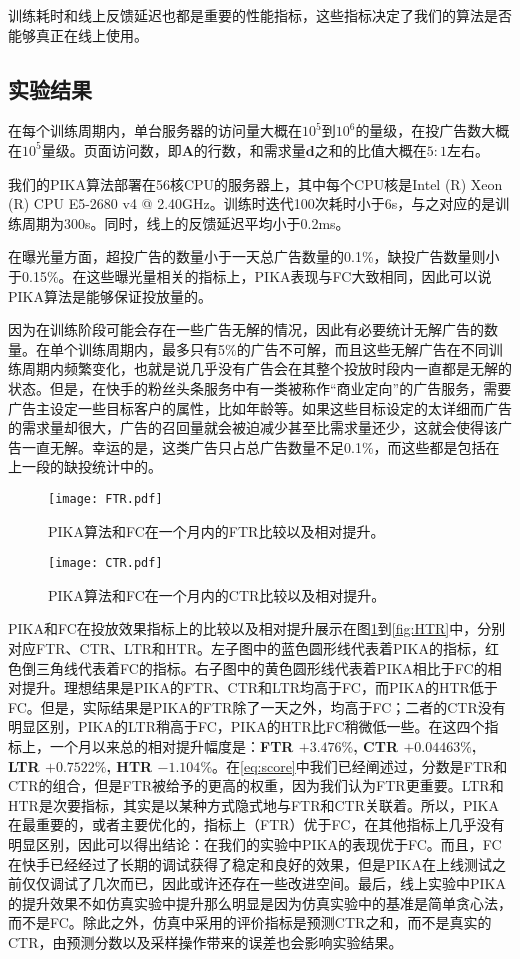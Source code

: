 训练耗时和线上反馈延迟也都是重要的性能指标，这些指标决定了我们的算法是否能够真正在线上使用。

\subsection{实验结果}

在每个训练周期内，单台服务器的访问量大概在$10^5$到$10^6$的量级，在投广告数大概在$10^5$量级。页面访问数，即$\bm{A}$的行数，和需求量$\bm{d}$之和的比值大概在$5:1$左右。

我们的PIKA算法部署在56核CPU的服务器上，其中每个CPU核是Intel (R) Xeon (R) CPU E5-2680 v4 @ 2.40GHz。训练时迭代100次耗时小于6s，与之对应的是训练周期为300s。同时，线上的反馈延迟平均小于0.2ms。

在曝光量方面，超投广告的数量小于一天总广告数量的0.1\%，缺投广告数量则小于0.15\%。在这些曝光量相关的指标上，PIKA表现与FC大致相同，因此可以说PIKA算法是能够保证投放量的。

因为在训练阶段可能会存在一些广告无解的情况，因此有必要统计无解广告的数量。在单个训练周期内，最多只有5\%的广告不可解，而且这些无解广告在不同训练周期内频繁变化，也就是说几乎没有广告会在其整个投放时段内一直都是无解的状态。但是，在快手的粉丝头条服务中有一类被称作“商业定向”的广告服务，需要广告主设定一些目标客户的属性，比如年龄等。如果这些目标设定的太详细而广告的需求量却很大，广告的召回量就会被迫减少甚至比需求量还少，这就会使得该广告一直无解。幸运的是，这类广告只占总广告数量不足0.1\%，而这些都是包括在上一段的缺投统计中的。

\begin{figure}[tb]
	\centering
	\texttt{[image: FTR.pdf]}
	\caption{PIKA算法和FC在一个月内的FTR比较以及相对提升。}
	\label{fig:FTR}
\end{figure}

\begin{figure}[tb]
	\centering
	\texttt{[image: CTR.pdf]}
	\caption{PIKA算法和FC在一个月内的CTR比较以及相对提升。}
	\label{fig:CTR}
\end{figure}

PIKA和FC在投放效果指标上的比较以及相对提升展示在图\ref{fig:FTR}到\ref{fig:HTR}中，分别对应FTR、CTR、LTR和HTR。左子图中的蓝色圆形线代表着PIKA的指标，红色倒三角线代表着FC的指标。右子图中的黄色圆形线代表着PIKA相比于FC的相对提升。理想结果是PIKA的FTR、CTR和LTR均高于FC，而PIKA的HTR低于FC。但是，实际结果是PIKA的FTR除了一天之外，均高于FC；二者的CTR没有明显区别，PIKA的LTR稍高于FC，PIKA的HTR比FC稍微低一些。在这四个指标上，一个月以来总的相对提升幅度是：\textbf{FTR $+3.476\%$, CTR $+0.04463\%$, LTR $+0.7522\%$, HTR $-1.104\%$}。在\eqref{eq:score}中我们已经阐述过，分数是FTR和CTR的组合，但是FTR被给予的更高的权重，因为我们认为FTR更重要。LTR和HTR是次要指标，其实是以某种方式隐式地与FTR和CTR关联着。所以，PIKA在最重要的，或者主要优化的，指标上（FTR）优于FC，在其他指标上几乎没有明显区别，因此可以得出结论：在我们的实验中PIKA的表现优于FC。而且，FC在快手已经经过了长期的调试获得了稳定和良好的效果，但是PIKA在上线测试之前仅仅调试了几次而已，因此或许还存在一些改进空间。最后，线上实验中PIKA的提升效果不如仿真实验中提升那么明显是因为仿真实验中的基准是简单贪心法，而不是FC。除此之外，仿真中采用的评价指标是预测CTR之和，而不是真实的CTR，由预测分数以及采样操作带来的误差也会影响实验结果。

